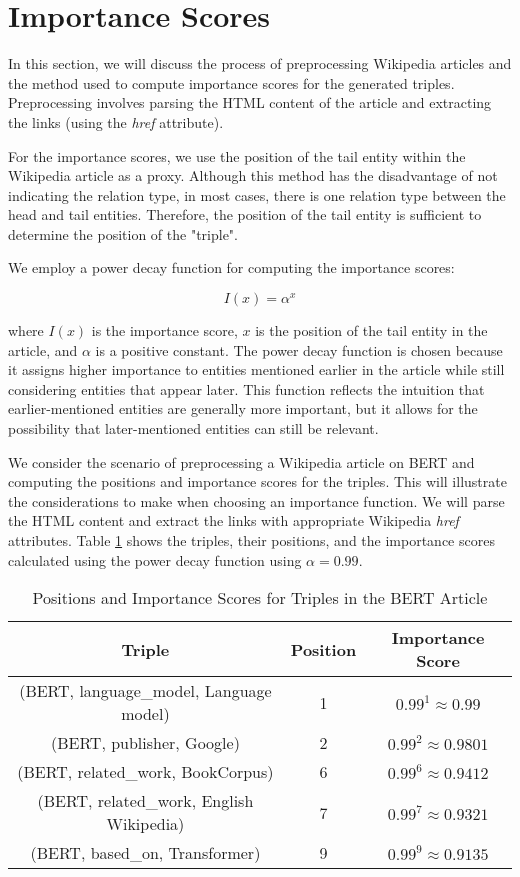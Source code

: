 \documentclass{article}
\begin{document}
\section{Importance Scores}

In this section, we will discuss the process of preprocessing Wikipedia articles and the method used to compute importance scores for the generated triples. Preprocessing involves parsing the HTML content of the article and extracting the links (using the \textit{href} attribute).

For the importance scores, we use the position of the tail entity within the Wikipedia article as a proxy. Although this method has the disadvantage of not indicating the relation type, in most cases, there is one relation type between the head and tail entities. Therefore, the position of the tail entity is sufficient to determine the position of the "triple".

We employ a power decay function for computing the importance scores:

\begin{equation}
  I(x) = \alpha^x
\end{equation}

where $I(x)$ is the importance score, $x$ is the position of the tail entity in the article, and $\alpha$ is a positive constant. The power decay function is chosen because it assigns higher importance to entities mentioned earlier in the article while still considering entities that appear later. This function reflects the intuition that earlier-mentioned entities are generally more important, but it allows for the possibility that later-mentioned entities can still be relevant.

We consider the scenario of preprocessing a Wikipedia article on BERT and computing the positions and importance scores for the triples. This will illustrate the considerations to make when choosing an importance function. We will parse the HTML content and extract the links with appropriate Wikipedia \textit{href} attributes. Table \ref{table:1} shows the triples, their positions, and the importance scores calculated using the power decay function using $\alpha = 0.99$.

\begin{table}[h]
  \label{table:1}
  \centering
  \begin{tabular}{|c|c|c|}
    \hline
    Triple & Position & Importance Score \\
    \hline
    (BERT, language\_model, Language model) & 1 & $0.99^{1} \approx 0.99$ \\
    (BERT, publisher, Google) & 2 & $0.99^{2} \approx 0.9801$ \\
    (BERT, related\_work, BookCorpus) & 6 & $0.99^{6} \approx 0.9412$ \\
    (BERT, related\_work, English Wikipedia) & 7 & $0.99^{7} \approx 0.9321$ \\
    (BERT, based\_on, Transformer) & 9 & $0.99^{9} \approx 0.9135$ \\
    \hline
  \end{tabular}

  \caption{Positions and Importance Scores for Triples in the BERT Article}
\end{table}
\end{document}
